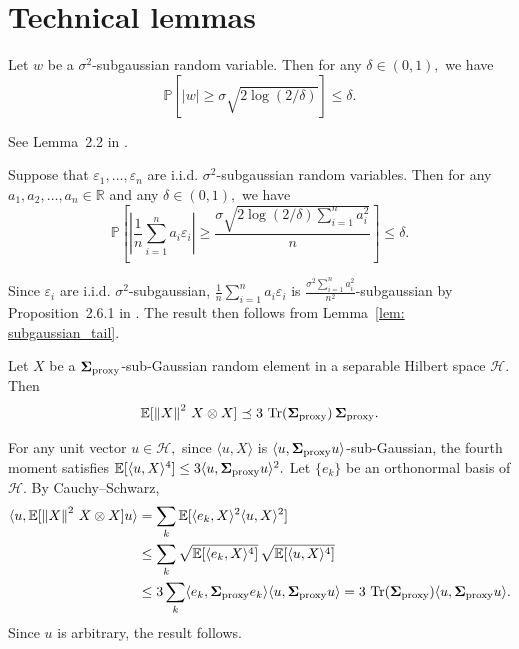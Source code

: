 \documentclass[mnsc]{informs3aa} %
\newcommand{\R}{\mathbb{R}}
\DeclareMathOperator{\Tr}{Tr}
\newcommand{\abs}[1]{\left|#1\right|}
\newcommand{\norm}[1]{\left\|#1\right\|}
\newcommand{\bSigma}{\bold{\Sigma}}
\newcommand{\mH}{\mathcal H}
\begin{document}
\section{Technical lemmas}
\begin{lemma}\label{lem: subgaussian_tail}
Let $w$ be a $\sigma^2$-subgaussian random variable. Then for any $\delta\in(0,1),$ we have
\[\mathbb{P}\left[|w|\geq \sigma\sqrt{2 \log(2/\delta)}\right]\leq \delta.\]
\end{lemma}
See Lemma~2.2 in \citet{wainwright2019high}.\Halmos
\endproof
\begin{lemma}\label{lem: iidsumofgaussian}
	Suppose that $\varepsilon_1,\ldots, \varepsilon_n$ are i.i.d. $\sigma^2$-subgaussian random variables. Then for any $a_1,a_2,\ldots, a_n\in\R$ and any $\delta\in(0,1),$ we have
	\[\mathbb{P}\left[\abs{\frac{1}{n}\sum_{i=1}^n a_i\varepsilon_i}\geq \frac{\sigma\sqrt{2\log(2/\delta)\sum_{i=1}^n a_i^2}}{n}\right]\leq \delta.\]
\end{lemma}
Since $\varepsilon_i$ are i.i.d. $\sigma^2$-subgaussian, $\frac{1}{n}\sum_{i=1}^n a_i\varepsilon_i$ is $\frac{\sigma^2\sum_{i=1}^n a_i^2}{n^2}$-subgaussian by Proposition~2.6.1 in \citet{wainwright2019high}. The result then follows from Lemma~\ref{lem: subgaussian_tail}.\Halmos
\endproof



\begin{lemma}\label{lem: fourth_moment_bound}
Let $X$ be a $\bSigma_{\mathrm{proxy}}$-sub-Gaussian random element in a separable Hilbert space $\mH.$ Then
\[\mathbb{E}[\norm{X}^2\,X\otimes X]\preceq 3\,\Tr(\bSigma_{\mathrm{proxy}})\,\bSigma_{\mathrm{proxy}}.\]
\end{lemma}
For any unit vector $u\in\mH,$ since $\langle u,X\rangle$ is $\langle u,\bSigma_{\mathrm{proxy}} u\rangle$-sub-Gaussian, the fourth moment satisfies $\mathbb{E}[\langle u,X\rangle^4]\leq 3\langle u,\bSigma_{\mathrm{proxy}} u\rangle^2.$ Let $\{e_k\}$ be an orthonormal basis of $\mH.$ By Cauchy--Schwarz,
\begin{align*}
\langle u,\mathbb{E}[\norm{X}^2\,X\otimes X]u\rangle
&=\sum_{k}\mathbb{E}[\langle e_k,X\rangle^2\langle u,X\rangle^2]\\
&\leq\sum_{k}\sqrt{\mathbb{E}[\langle e_k,X\rangle^4]}\,\sqrt{\mathbb{E}[\langle u,X\rangle^4]}\\
&\leq 3\sum_{k}\langle e_k,\bSigma_{\mathrm{proxy}} e_k\rangle\langle u,\bSigma_{\mathrm{proxy}} u\rangle=3\,\Tr(\bSigma_{\mathrm{proxy}})\langle u,\bSigma_{\mathrm{proxy}} u\rangle.
\end{align*}
Since $u$ is arbitrary, the result follows.\Halmos
\endproof
\end{document}
